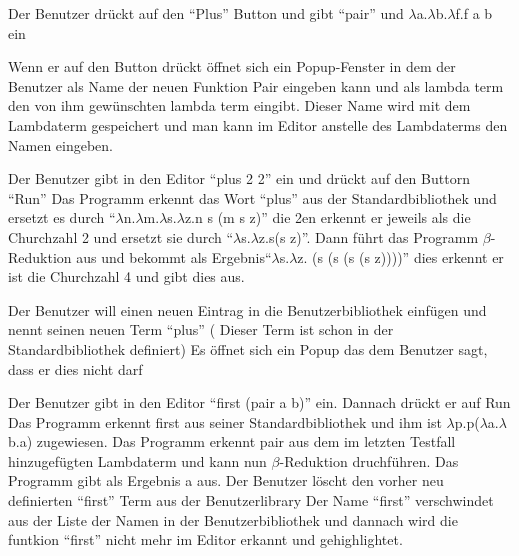 \documentclass[parskip=full,11pt,twoside]{scrartcl}
\begin{document}
{ Der Benutzer drückt auf den \enquote {Plus} Button und gibt \enquote {pair} und $\lambda$a.$\lambda$b.$\lambda$f.f a b ein }
{Wenn er auf den Button drückt öffnet sich ein Popup-Fenster in dem der Benutzer als Name der neuen Funktion Pair eingeben kann und als lambda term den von ihm gewünschten lambda term eingibt. Dieser Name wird mit dem Lambdaterm gespeichert und man kann im Editor anstelle des Lambdaterms den Namen eingeben.


{Der Benutzer gibt in den Editor \enquote {plus 2 2} ein und drückt auf den Buttorn \enquote {Run}}
{ Das Programm erkennt das Wort \enquote {plus} aus der Standardbibliothek und ersetzt es durch \enquote {$\lambda$n.$\lambda$m.$\lambda$s.$\lambda$z.n s (m s z)} die 2en erkennt er jeweils als die Churchzahl 2 und ersetzt sie durch \enquote {$\lambda$s.$\lambda$z.s(s z)}. Dann führt das Programm $\beta$-Reduktion aus und bekommt als Ergebnis\enquote {$\lambda$s.$\lambda$z. (s (s (s (s z))))} dies erkennt er ist die Churchzahl 4 und gibt dies aus. }

{Der Benutzer will einen neuen Eintrag in die Benutzerbibliothek einfügen und nennt seinen neuen Term \enquote{plus} ( Dieser Term ist schon in der Standardbibliothek definiert) }
{Es öffnet sich ein Popup das dem Benutzer sagt, dass er dies nicht darf}

{ Der Benutzer gibt in den Editor \enquote {first (pair a b)} ein. Dannach drückt er auf Run}
{ Das Programm erkennt first aus seiner Standardbibliothek und ihm ist $\lambda$p.p($\lambda$a.$\lambda$b.a) zugewiesen. Das Programm erkennt pair aus dem im letzten Testfall hinzugefügten Lambdaterm und kann nun $\beta$-Reduktion druchführen. Das Programm gibt als Ergebnis a aus.}
{Der Benutzer löscht den vorher neu definierten \enquote{first} Term aus der Benutzerlibrary}
{Der Name \enquote{first} verschwindet aus der Liste der Namen in der Benutzerbibliothek und dannach wird die funtkion \enquote{first} nicht mehr im Editor erkannt und gehighlightet.}

}
\end{document}
